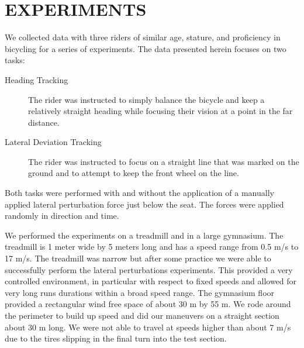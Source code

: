 \documentclass[twocolumn,10pt]{asme2e}
\begin{document}
\section*{EXPERIMENTS}
We collected data with three riders of similar age, stature, and proficiency in
bicycling for a series of experiments. The data presented herein focuses on
two tasks:

\begin{description}
	\item[Heading Tracking]
		The rider was instructed to simply balance the bicycle and keep a
		relatively straight heading while focusing their vision at a point in the
		far distance.
	\item[Lateral Deviation Tracking]
		The rider was instructed to focus on a straight line that was marked on the
		ground and to attempt to keep the front wheel on the line.
\end{description}

Both tasks were performed with and without the application of a manually
applied lateral perturbation force just below the seat. The forces were applied
randomly in direction and time.

We performed the experiments on a treadmill and in a large gymnasium. The
treadmill is 1 meter wide by 5 meters long and has a speed range from 0.5 m/s
to 17 m/s. The treadmill was narrow but after some practice we were able to
successfully perform the lateral perturbations experiments. This provided a
very controlled environment, in particular with respect to fixed speeds and
allowed for very long runs durations within a broad speed range. The gymnasium
floor provided a rectangular wind free space of about 30 m by 55 m. We rode
around the perimeter to build up speed and did our maneuvers on a straight
section about 30 m long. We were not able to travel at speeds higher than about
7 m/s due to the tires slipping in the final turn into the test section.
\end{document}
